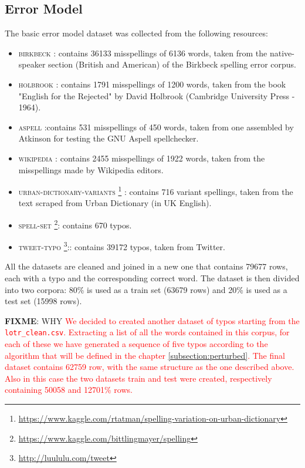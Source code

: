 \subsection{Error Model}
The basic error model dataset was collected from the following resources:
\begin{itemize}
	\item \textsc{birkbeck}  : contains \num{36133} 
	misspellings of \num{6136} words, taken from the native-speaker section (British and American) of the Birkbeck spelling 
	error corpus.
	\item \textsc{holbrook} : contains \num{1791} misspellings of \num{1200} words, taken from the book 
	"English for the Rejected" by David Holbrook (Cambridge University Press - 1964).
	\item \textsc{aspell}  :contains \num{531} misspellings of \num{450} words, taken from one assembled by 
	Atkinson for testing the GNU Aspell spellchecker.
	\item \textsc{wikipedia} : contains \num{2455} misspellings of \num{1922} words, taken from the 
	misspellings made by Wikipedia editors.
	\item \textsc{urban-dictionary-variants} 
	\footnote{\url{https://www.kaggle.com/rtatman/spelling-variation-on-urban-dictionary}}  : contains \num{716} variant 
	spellings, taken from the text scraped from Urban Dictionary (in UK English).
	\item \textsc{spell-set} \footnote{\url{https://www.kaggle.com/bittlingmayer/spelling}}: contains \num{670} typos.
	\item \textsc{tweet-typo} \footnote{\url{http://luululu.com/tweet}}:: contains \num{39172} typos, taken from Twitter.
\end{itemize}

All the datasets are cleaned and joined in a new one that contains \num{79677} rows, each with a typo and the 
corresponding correct word.
The dataset is then divided into two corpora: \num{80}\% is used as a train set (\num{63679} rows) and \num{20}\% 
is used as a test set (\num{15998} rows).


\textbf{FIXME}: {WHY}\textcolor{red}{
We decided to created another dataset of typos starting from the \\\texttt{lotr\_clean.csv}. 
Extracting a list of all the words contained in this corpus, for each of these we have generated a sequence of five typos 
according to the algorithm that will be defined in the chapter \ref{subsection:perturbed}.
The final dataset contains \num{62759} row, with the same structure as the one described above.
Also in this case the two datasets train and test were created, respectively containing \num{50058} and \num{12701}\% 
rows.}


